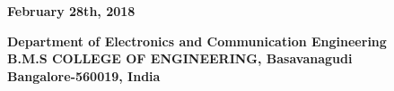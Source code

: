 \begin{center}
\vspace*{3mm}

{\fontsize{14pt}{16.8pt}\selectfont\textbf{February 28th, 2018}} \\

\vspace*{5mm}

\fontsize{14pt}{16.8pt}\selectfont\textbf{Department of Electronics and Communication Engineering \\
\vspace*{4mm}
\vspace*{2mm} B.M.S COLLEGE OF ENGINEERING, Basavanagudi} \\
\vspace*{2mm}
\fontsize{14pt}{16.8pt}\selectfont\textbf{Bangalore-560019, India} 
\vspace*{10mm}\\

\end{center}
